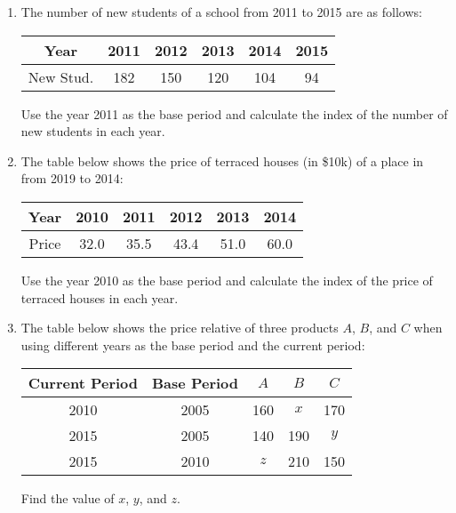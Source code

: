 \documentclass{report}
\begin{document}
\begin{multicols}{2}
\begin{enumerate}
    \item The number of new students of a school from 2011 to 2015 are as follows:
          \begin{center}
            \begin{tabular}{|c|c|c|c|c|c|}
              \hline
              Year      & 2011 & 2012 & 2013 & 2014 & 2015 \\
              \hline
              New Stud. & 182  & 150  & 120  & 104  & 94   \\
              \hline
            \end{tabular}
          \end{center}
          Use the year 2011 as the base period and calculate the index of the number of new students in each year.

    \item The table below shows the price of terraced houses (in \$10k) of a place in
          from 2019 to 2014:
          \begin{center}
            \begin{tabular}{|c|c|c|c|c|c|}
              \hline
              Year  & 2010 & 2011 & 2012 & 2013 & 2014 \\
              \hline
              Price & 32.0 & 35.5 & 43.4 & 51.0 & 60.0 \\
              \hline
            \end{tabular}
          \end{center}
          Use the year 2010 as the base period and calculate the index of the price of terraced houses in each year.

    \item The table below shows the price relative of three products $A$, $B$, and $C$
          when using different years as the base period and the current period:
          \begin{center}
            \begin{tabular}{|c|c|c|c|c|}
              \hline
              Current Period & Base Period & $A$ & $B$ & $C$ \\
              \hline
              2010           & 2005        & 160 & $x$ & 170 \\
              2015           & 2005        & 140 & 190 & $y$ \\
              2015           & 2010        & $z$ & 210 & 150 \\
              \hline
            \end{tabular}
          \end{center}
          Find the value of $x$, $y$, and $z$.


\end{enumerate}
\end{multicols}
\end{document}

